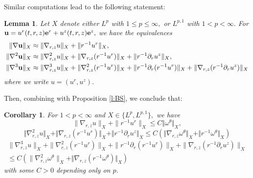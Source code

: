 \documentclass[11pt]{amsart}
\newtheorem{lem}{Lemma}[section]
\newtheorem{corollary}{Corollary}[section]
\numberwithin{equation}{section}
\newcommand{\nrm}[1]{\Vert#1\Vert}
\def\d{\partial}
\newcommand{\nb}{\nabla}
\newcommand{\tht}{\theta}
\newcommand{\omg}{\omega}
\newcommand{\bfe}{{\bf e}}
\newcommand{\bfu}{{\bf u}}
\begin{document}
	Similar computations lead to the following statement: 
\begin{lem}\label{l:nablau} Let $X$ denote either  $L^p$ with $1\leq p\leq\infty,$
or $L^{p,1}$ with $1<p<\infty.$ 
For	$\bfu = u^{r}(t,r,z) \bfe^{r} + u^{z}(t,r,z) \bfe^{z},$ we have the equivalences 
\begin{align*}
	 \|\nabla \bfu\|_{X} &\approx \| \nb_{r,z} u\|_{X} + \|r^{-1} u^{r} \|_{X} , \\
	\|\nabla^2 \mathbf{u}\|_{X} &\approx   \nrm{\nb^2_{r,z} u  }_{X}  + \nrm{ \nb_{r,z}(r^{-1} u^{r})}_{X}  + \nrm{ r^{-1} \d_{r} u^{z}}_{X}  , \\
			\|\nabla^3 \mathbf{u}\|_{X} &\approx   \|\nabla^3_{r,z}  {u}\|_{X}  + \|\nabla^2_{r,z}(r^{-1}u^r)\|_{X} + \|r^{-1}\partial_r(r^{-1}u^r)\|_{X}  + \|\nabla_{r,z}(r^{-1}\partial_r u^z)\|_{X} 
		\end{align*} 
		where we write $u = (u^r, u^z)$. 
	\end{lem}
Then, combining with Proposition \ref{l:BS}, we conclude that:	
	\begin{corollary} \label{cor:Lp}
		For  $1 < p < \infty$ and $X\in\{L^p,L^{p,1}\},$  we have 
		\begin{equation*}
				\| \nb_{r,z} u\|_{X} + \|r^{-1} u^{r} \|_{X}  \le C \nrm{\omg^{\tht}}_{X}, 
					\end{equation*}\begin{equation*}
					\nrm{\nb^2_{r,z} u  }_{X}  + \nrm{ \nb_{r,z}(r^{-1} u^{r})}_{X}  + \nrm{ r^{-1} \d_{r} u^{z}}_{X}  \le C \left( \nrm{\nb_{r,z}\omg^{\tht}}_{X} + \nrm{r^{-1}\omg^{\tht}}_{X}  \right)
				\end{equation*} \begin{multline*}
			\|\nabla^3_{r,z}  {u}\|_{X}  + \|\nabla^2_{r,z}(r^{-1}u^r)\|_{X} + \|r^{-1}\partial_r(r^{-1}u^r)\|_{X}  + \|\nabla_{r,z}(r^{-1}\partial_r u^z)\|_{X} \\\le C \left(\|\nb_{r,z}^2 \omega^\theta\|_{X} + \nrm{ \nb_{r,z} (r^{-1}\omg^{\tht}) }_{X} \right)
				\end{multline*} with some $C > 0$ depending only on $p$.
				 	\end{corollary}
	


  
 
 
 
\end{document}
